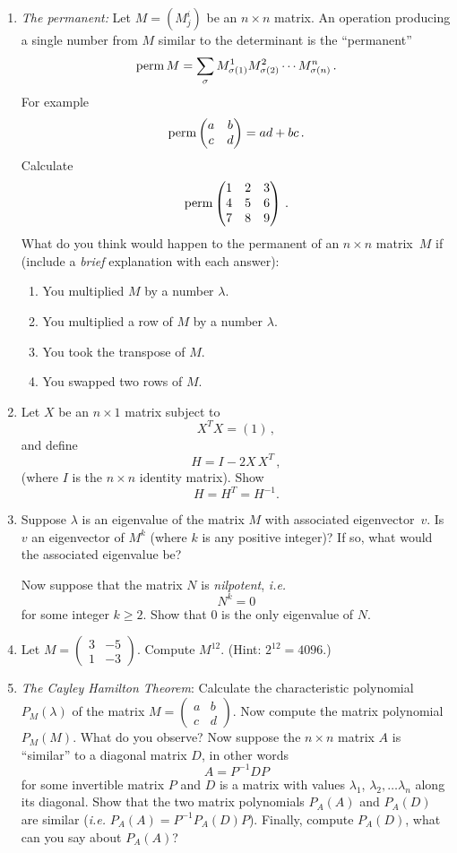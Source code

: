 \begin{enumerate}
\item
{\itshape The permanent:} Let $M=(M^i_j)$ be an $n\times n$ matrix. An operation producing a single number from $M$ similar
to the determinant is the ``permanent''
\[
\operatorname{perm} M =\sum_\sigma M^1_{\sigma(1)} M^2_{\sigma(2)}\cdots M^n_{\sigma(n)}\, .
\]
For example
\[
\operatorname{perm} \begin{pmatrix}a & b \\ c & d\end{pmatrix}=ad+bc\, .
\]
{Calculate} 
\[
\operatorname{perm} \begin{pmatrix}1 & 2 & 3 \\ 4 & 5 & 6 \\ 7 & 8 & 9\end{pmatrix}\, .
\]
\noindent
What do you think would happen to the permanent of an $n\times n$ matrix~$M$ if (include a {\itshape brief} explanation with each answer):
\begin{enumerate}
\item You multiplied $M$ by a number $\lambda$.
\item You multiplied a row of $M$ by a number $\lambda$.
\item You took the transpose of $M$.
\item  You swapped two rows of $M$.
\end{enumerate}


\item
Let $X$ be an $n\times 1$ matrix subject to
\[
{X}^{T} X=(1)\, ,
\]
and define
\[
H=I - 2 X \,\!X^T\, ,
\]
(where $I$ is the $n\times n$ identity matrix).
Show 
\[
H=H^{T}=H^{-1}.
\]

\item Suppose $\lambda$ is an eigenvalue of the matrix $M$ with associated eigenvector~$v$.
Is~$v$ an eigenvector of $M^k$ (where $k$ is any positive integer)? If so, what would the associated
eigenvalue be?

Now suppose that the matrix $N$ is {\itshape nilpotent}, {\itshape i.e.}
\[
N^k=0
\]
for some integer $k\geq 2$. Show that 0 is the only eigenvalue of $N$.

\item
Let $M=\begin{pmatrix}3&-5\\[2mm]1&-3\end{pmatrix}$. Compute $M^{12}$. (Hint: $2^{12}=4096$.)

\item {\itshape The Cayley Hamilton Theorem}:
Calculate the characteristic polynomial $P_M(\lambda)$ of the matrix $M=\begin{pmatrix}a & b\\c & d\end{pmatrix}$.
Now compute the matrix polynomial $P_M(M)$. What do you observe? Now suppose the $n\times n$ matrix $A$
is ``similar'' to a diagonal matrix $D$, in other words \[A=P^{-1}DP\] for some invertible matrix $P$ and $D$ is a matrix with values $\lambda_1$, $\lambda_2,\ldots \lambda_n$ along its diagonal. Show that the two matrix polynomials $P_A(A)$ and $P_A(D)$ are similar ({\itshape i.e.} $P_A(A)=P^{-1} P_A(D) P$).
Finally, compute $P_A(D)$, what can you say about $P_A(A)$?


\end{enumerate}
